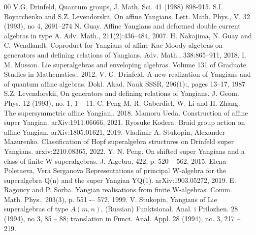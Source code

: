 \documentclass[english]{elsarticle}
\numberwithin{equation}{section}
\begin{document}
\begin{thebibliography}{00}
 V.G. Drinfeld, Quantum groups, J. Math. Sci. 41 (1988) 898-915.
S.I. Boyarchenko and S.Z. Levendorskii,  On affine Yangians.  Lett. Math. Phys., V. 32 (1993), no 4, 2691--274
N. Guay. Affine Yangians and deformed double current algebras in type A. Adv. Math., 211(2):436–484, 2007.
H. Nakajima, N. Guay and C. Wendlandt. Coproduct for Yangians of affine Kac-Moody algebras on generators and
defining relations of Yangians. Adv. Math., 338:865–911, 2018.
I. M. Musson. Lie superalgebras and enveloping algebras. Volume 131 of Graduate Studies in Mathematics., 2012.
V. G. Drinfeld. A new realization of Yangians and of quantum affine algebras. Dokl. Akad. Nauk SSSR, 296(1):,
pages 13–17, 1987
 S.Z. Levendorskii, On generators and defining relations of Yangians. J. Geom. Phys. 12 (1993), no. 1, 1 -- 11.
C. Peng M. R. Gaberdiel, W. Li and H. Zhang. The supersymmetric affine Yangian,. 2018.
Mamoru Ueda. Construction of affine super Yangian. arXiv:1911.06666, 2021.
Ryosuke Kodera. Braid group action on affine Yangian. arXiv:1805.01621, 2019.
Vladimir A. Stukopin, Alexander Mazurenko. Classification of Hopf superalgebra structures on Drinfeld super
Yangians. arxiv:2210.08365, 2022.
Y. N. Peng. On shifted super Yangians and a class of finite W-superalgebras. J. Algebra, 422, p. 520 -- 562, 2015.
Elena Poletaeva, Vera Serganova
 Representations of principal W-algebra for the superalgebra Q(n) and the super Yangian YQ(1). arXiv:1903.05272, 2019.
E. Ragoucy and P. Sorba. Yangian realisations from finite W-algebras. Comm. Math. Phys., 203(3), p. 551 -– 572, 1999.
 V. Stukopin, Yangians of Lie superalgebras of type $A(m, n)$, (Russian) Funktsional. Anal. i Prilozhen. 28 (1994), no 3, 85 -- 88; translation in Funct. Anal. Appl. 28 (1994), no. 3, 217 -- 219.
\end{thebibliography}
\end{document}
